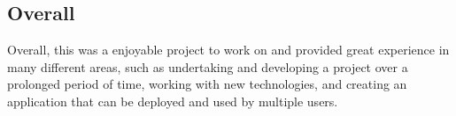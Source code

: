 \subsection{Overall}
Overall, this was a enjoyable project to work on and provided great experience in many different areas, such as undertaking and developing a project over a prolonged period of time, working with new technologies, and creating an application that can be deployed and used by multiple users.